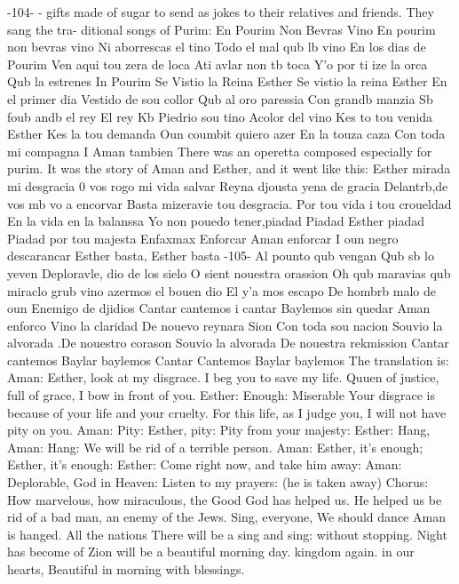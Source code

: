 {{-104- 
- gifts made of sugar to send as jokes to their relatives and friends. They sang the tra-
ditional songs of Purim: 
En Pourim Non Bevras Vino 
En pourim non bevras vino 
Ni aborrescas el tino 
Todo el mal qub lb vino 
En los dias de Pourim 
Ven aqui tou zera de loca 
Ati avlar non tb toca 
Y'o por ti ize la orca 
Qub la estrenes 
In Pourim 
Se Vistio la Reina Esther 
Se vistio la reina Esther 
En el primer dia 
Vestido de sou collor 
Qub al oro paressia 
Con grandb manzia 
Sb foub andb el rey 
El rey Kb %
Piedrio sou tino 
Acolor del vino 
Kes to tou venida Esther 
Kes la tou demanda 
Oun coumbit quiero azer 
En la touza caza 
Con toda mi compagna 
I Aman tambien 
There was an operetta composed especially for purim. It was the story of Aman and 
Esther, and it went like this: 
Esther mirada mi desgracia 
0 vos rogo mi vida salvar 
Reyna djousta yena de gracia 
Delantrb,de vos mb vo a encorvar 
Basta mizeravie tou desgracia. 
Por tou vida i tou croueldad 
En la vida en la balanssa 
Yo non pouedo tener,piadad 
Piadad Esther piadad 
Piadad por tou majesta 
Enfaxmax 
Enforcar Aman enforcar 
I oun negro descarancar 
Esther basta, Esther basta 
-105- 
Al pounto qub vengan 
Qub sb lo yeven 
Deploravle, dio de los sielo 
O sient nouestra orassion 
Oh qub maravias qub miraclo 
grub vino azermos el bouen dio 
El y'a mos escapo 
De hombrb malo de oun 
Enemigo de djidios 
Cantar cantemos i cantar 
Baylemos sin quedar 
Aman enforco 
Vino la claridad 
De nouevo reynara Sion 
Con toda sou nacion 
Souvio la alvorada 
.De nouestro corason 
Souvio la alvorada 
De nouestra rekmission 
Cantar cantemos 
Baylar baylemos 
Cantar Cantemos 
Baylar baylemos 
The translation is: 
Aman: Esther, look at my disgrace. I beg you to save my life. Quuen 
of justice, full of grace, I bow in front of you. 
Esther: Enough: Miserable Your disgrace is because of your life and 
your cruelty. For this life, as I judge you, I will not have 
pity on you. 
Aman: Pity: Esther, pity: Pity from your majesty: 
Esther: Hang, Aman: Hang: We will be rid of a terrible person. 
Aman: Esther, it's enough; Esther, it's enough: 
Esther: Come right now, and take him away: 
Aman: Deplorable, God in Heaven: Listen to my prayers: 
(he is taken away) 
Chorus: How marvelous, how miraculous, the Good God has helped us. He 
helped us be rid of a bad man, an enemy of the Jews. 
Sing, everyone, 
We should dance 
Aman is hanged. 
All the nations 
There will be a 
sing and sing: 
without stopping. 
Night has become 
of Zion will be a 
beautiful morning 
day. 
kingdom again. 
in our hearts, 
Beautiful in morning with blessings. 
}}

